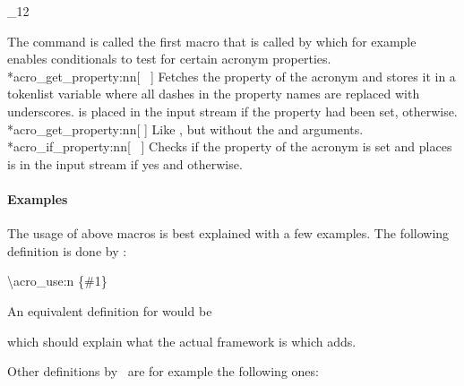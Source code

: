 \documentclass[load-preamble+]{cnltx-doc}
\makeatletter
\newcommand*\TF{\textcolor{red}{\uline{\code{\textcolor{cs}{\textit{TF}}}}}}
\renewenvironment{commands}
  {%
    \cnltx@set@catcode_{12}%
    \let\command\cnltx@command
    \cnltxlist
  }
  {\endcnltxlist}
\makeatother
\begin{document}
\begin{commands}
    The  command is called the first macro that is called by
     which for example enables conditionals to test for
    certain acronym properties.
  \command*{acro_get_property:nn}[\TF\   
    ]
    Fetches the property  of the acronym
     and stores it in a tokenlist variable
     where all dashes in the property names
    are replaced with underscores.   is placed in the input stream
    if the property had been set,  otherwise.
  \command*{acro_get_property:nn}[ ]
    Like \TF, but without the
     and  arguments.
  \command*{acro_if_property:nn}[\TF\   
    ]
    Checks if the property  of the acronym
     is set and places  is in the input stream if yes and
     otherwise.
\end{commands}

\paragraph{Examples}
The usage of above macros is best explained with a few examples.  The
following definition is done by \acro:
\begin{sourcecode}
  \NewAcroCommand \ac { \acro_use:n {#1} }
\end{sourcecode}
An equivalent definition for  would be
which should explain what the actual framework is which 
adds.

Other definitions by \acro\ are for example the following ones:
\end{document}
